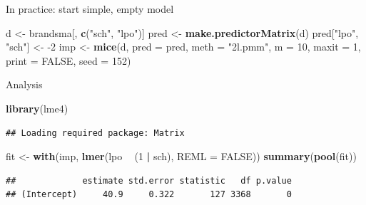 \documentclass[ignorenonframetext,aspectratio=43]{beamer}
\newenvironment{Shaded}{\begin{snugshade}}{\end{snugshade}}
\newcommand{\DataTypeTok}[1]{\textcolor[rgb]{0.13,0.29,0.53}{#1}}
\newcommand{\DecValTok}[1]{\textcolor[rgb]{0.00,0.00,0.81}{#1}}
\newcommand{\KeywordTok}[1]{\textcolor[rgb]{0.13,0.29,0.53}{\textbf{#1}}}
\newcommand{\NormalTok}[1]{#1}
\newcommand{\OperatorTok}[1]{\textcolor[rgb]{0.81,0.36,0.00}{\textbf{#1}}}
\newcommand{\OtherTok}[1]{\textcolor[rgb]{0.56,0.35,0.01}{#1}}
\newcommand{\StringTok}[1]{\textcolor[rgb]{0.31,0.60,0.02}{#1}}
\begin{document}
\begin{frame}[fragile]{In practice: start simple, empty model}
\protect\hypertarget{in-practice-start-simple-empty-model}{}

\begin{Shaded}
\begin{Highlighting}[]
\NormalTok{d <-}\StringTok{ }\NormalTok{brandsma[, }\KeywordTok{c}\NormalTok{(}\StringTok{"sch"}\NormalTok{, }\StringTok{"lpo"}\NormalTok{)]}
\NormalTok{pred <-}\StringTok{ }\KeywordTok{make.predictorMatrix}\NormalTok{(d)}
\NormalTok{pred[}\StringTok{"lpo"}\NormalTok{, }\StringTok{"sch"}\NormalTok{] <-}\StringTok{ }\DecValTok{-2}
\NormalTok{imp <-}\StringTok{ }\KeywordTok{mice}\NormalTok{(d, }\DataTypeTok{pred =}\NormalTok{ pred, }\DataTypeTok{meth =} \StringTok{"2l.pmm"}\NormalTok{, }\DataTypeTok{m =} \DecValTok{10}\NormalTok{, }
            \DataTypeTok{maxit =} \DecValTok{1}\NormalTok{, }\DataTypeTok{print =} \OtherTok{FALSE}\NormalTok{, }\DataTypeTok{seed =} \DecValTok{152}\NormalTok{)}
\end{Highlighting}
\end{Shaded}

\end{frame}

\begin{frame}[fragile]{Analysis}
\protect\hypertarget{analysis}{}

\begin{Shaded}
\begin{Highlighting}[]
\KeywordTok{library}\NormalTok{(lme4)}
\end{Highlighting}
\end{Shaded}

\begin{verbatim}
## Loading required package: Matrix
\end{verbatim}

\begin{Shaded}
\begin{Highlighting}[]
\NormalTok{fit <-}\StringTok{ }\KeywordTok{with}\NormalTok{(imp, }\KeywordTok{lmer}\NormalTok{(lpo }\OperatorTok{~}\StringTok{ }\NormalTok{(}\DecValTok{1} \OperatorTok{|}\StringTok{ }\NormalTok{sch), }\DataTypeTok{REML =} \OtherTok{FALSE}\NormalTok{))}
\KeywordTok{summary}\NormalTok{(}\KeywordTok{pool}\NormalTok{(fit))}
\end{Highlighting}
\end{Shaded}

\begin{verbatim}
##             estimate std.error statistic   df p.value
## (Intercept)     40.9     0.322       127 3368       0
\end{verbatim}

\end{frame}
\end{document}
